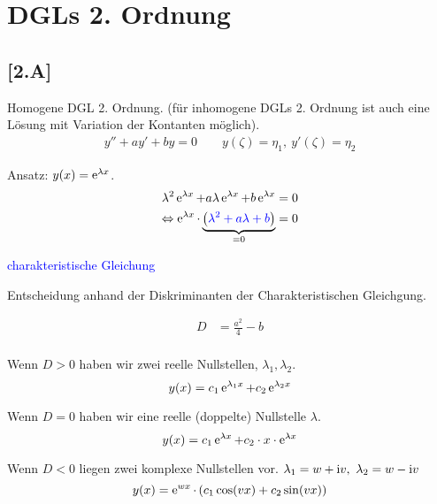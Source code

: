 \documentclass[main.tex]{subfiles}
\begin{document}
\section{DGLs 2. Ordnung} \label{zweite_ordnung}

\subsection*{[2.A]}

Homogene DGL 2. Ordnung. (für inhomogene DGLs 2. Ordnung ist auch eine Lösung mit Variation der Kontanten möglich).
\begin{align*}
	y'' + a y' + by = 0 \qquad y(\zeta) = \eta_1,\ y'(\zeta) = \eta_2
\end{align*}

Ansatz: $y(x) = \operatorname{\mathrm{e}}^{\lambda x}$. 
\begin{align*}
	\lambda^2 \operatorname{\mathrm{e}}^{\lambda x} + a\lambda \operatorname{\mathrm{e}}^{\lambda x} + b\operatorname{\mathrm{e}}^{\lambda x} = 0 \\
	\Leftrightarrow \operatorname{\mathrm{e}}^{\lambda x} \cdot \underbrace{\left( \textcolor{blue}{\lambda^2 +a\lambda + b} \right)}_{= 0} = 0
\end{align*}

\textcolor{blue}{charakteristische Gleichung}

Entscheidung anhand der Diskriminanten der Charakteristischen Gleichgung.

\begin{align}
	D &= \frac{a^2}{4} -b \\
\end{align}

Wenn $D > 0$ haben wir zwei reelle Nullstellen, $\lambda_1, \lambda_2$.
$$
	y(x) = c_1 \operatorname{\mathrm{e}}^{\lambda_1 x} + c_2 \operatorname{\mathrm{e}}^{\lambda_2 x} 
$$

Wenn $D = 0$ haben wir eine reelle (doppelte) Nullstelle $\lambda$.
$$
	y(x) = c_1 \operatorname{\mathrm{e}}^{\lambda x} + c_2 \cdot x \cdot \operatorname{\mathrm{e}}^{\lambda x} 
$$

Wenn $D < 0$ liegen zwei komplexe Nullstellen vor. $\lambda_1 = w + \mathrm{i}v,\ \lambda_2 = w - \mathrm{i}v$
$$
	y(x) = \operatorname{\mathrm{e}}^{w x} \cdot \left( c_1 \cos(v x) + c_2 \sin(v x) \right) 
$$
\end{document}
